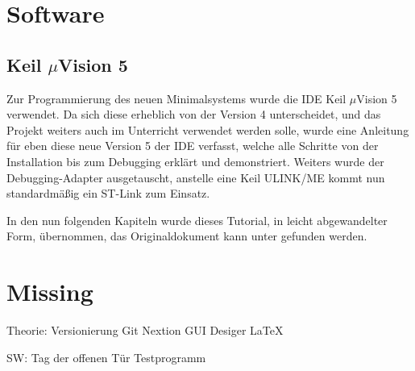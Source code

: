 \newcommand*{\uVision}{$\mu$Vision}

\clearpage
{}
\section{Software}
\label{sec:software}

\subsection{Keil \uVision{} 5}
\label{sec:uvision-5}

Zur Programmierung des neuen \gls{Minimalsystem}s wurde die \gls{IDE} Keil \uVision{} 5 verwendet. Da sich diese erheblich von der Version 4 unterscheidet, und das Projekt weiters auch im Unterricht verwendet werden solle, wurde eine Anleitung für eben diese neue Version 5 der \gls{IDE} verfasst, welche alle Schritte von der Installation bis zum \gls{Debugging} erklärt und demonstriert. Weiters wurde der \gls{Debugging}-Adapter ausgetauscht, anstelle eine \gls{Keil} ULINK/ME kommt nun standardmäßig ein ST-Link zum Einsatz.

In den nun folgenden Kapiteln wurde dieses Tutorial, in leicht abgewandelter Form, übernommen, das Originaldokument kann unter \cite{doku:tutorial} gefunden werden.





\section{Missing}
Theorie:
Versionierung
Git
Nextion GUI Desiger
LaTeX

SW:
Tag der offenen Tür
Testprogramm